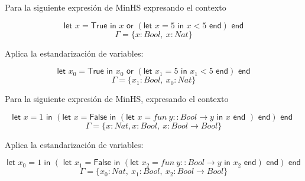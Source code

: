 \begin{exercise}    
    Para la siguiente expresión de \textsf{MinHS} expresando el contexto

    $$ \textsf{let } x = \textsf{True} \textsf{ in } x \textsf{ or } (\textsf{let } x = 5 \textsf{ in } x < 5 \textsf{ end}) \textsf{ end} $$
    $$ \Gamma = \{x:Bool,\ x:Nat\}$$
    
    Aplica la estandarización de variables: 
    
    $$ \textsf{let } x_0 = \textsf{True} \textsf{ in } x_0 \textsf{ or } (\textsf{let } x_1 = 5 \textsf{ in } x_1 < 5 \textsf{ end}) \textsf{ end} $$
    $$ \Gamma = \{x_1:Bool,\ x_0:Nat\}$$
\end{exercise}

\begin{exercise}    
    Para la siguiente expresión de \textsf{MinHS}, expresando el contexto
    
    $$ \textsf{let } x = 1 \textsf{ in } (\textsf{let } x = \textsf{False} \textsf{ in } (\textsf{let } x = fun\ y :: Bool \to y  \textsf{ in } x \textsf{ end }) \textsf{ end}) \textsf{ end }$$
    $$ \Gamma = \{ x : Nat, x : Bool,\ x : Bool \to Bool \}$$
    
    Aplica la estandarización de variables:
    
    $$ \textsf{let } x_0 = 1 \textsf{ in } (\textsf{ let } x_1 = \textsf{False} \textsf{ in } (\textsf{let } x_2 = fun\ y :: Bool \to y  \textsf{ in } x_2 \textsf{ end}) \textsf{ end}) \textsf{ end} $$
    $$ \Gamma = \{ x_0 : Nat,\ x_1 : Bool,\ x_2 : Bool \to Bool \}$$
\end{exercise}

